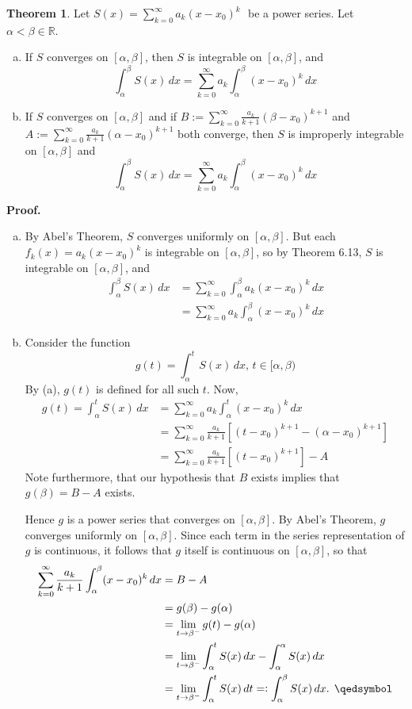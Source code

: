 \documentclass[11pt]{article}
\theoremstyle{definition}
\newtheorem{thm}{Theorem}[section]
\newcommand{\mbR}{\ensuremath{\mathbb{R}}}
\newcommand{\powerseries}{\ensuremath{S(x) = \sum_{k=0}^\infty a_k (x - x_0)^k \text{ }}}
\begin{document}
\begin{thm}
Let \powerseries be a power series. Let $\alpha < \beta \in \mbR$.
\begin{enumerate}[(a)] \vspace{-0.2cm}
\item If $S$ converges on $[\alpha, \beta]$, then $S$ is integrable on $[\alpha, \beta]$, and
$$\int_\alpha^\beta S(x)\,dx = \sum_{k=0}^\infty a_k \int_\alpha^\beta (x - x_0)^k \,dx$$
\item If $S$ converges on $[\alpha, \beta]$ and if $B := \sum_{k=0}^\infty \frac{a_k}{k+1} (\beta - x_0)^{k+1}$ and $A := \sum_{k=0}^\infty \frac{a_k}{k+1} (\alpha - x_0)^{k+1}$ both converge, then $S$ is improperly integrable on $[\alpha, \beta]$ and
$$\int_\alpha^\beta S(x)\,dx = \sum_{k=0}^\infty a_k \int_\alpha^\beta (x - x_0)^k \,dx$$
\end{enumerate}
\end{thm}
\textbf{Proof.}
\begin{enumerate}[(a)] \vspace{-0.2cm}
\item By Abel's Theorem, $S$ converges uniformly on $[\alpha, \beta]$. But each $f_k(x) = a_k (x - x_0)^k$ is integrable on $[\alpha, \beta]$, so by Theorem 6.13, $S$ is integrable on $[\alpha, \beta]$, and
\begin{align*}
\int_\alpha^\beta S(x)\,dx & = \sum_{k=0}^\infty \int_\alpha^\beta a_k(x - x_0)^k\,dx \\
& = \sum_{k=0}^\infty a_k \int_\alpha^\beta (x - x_0)^k\,dx
\end{align*}
\item Consider the function
$$g(t) = \int_\alpha^t S(x)\,dx, \, t \in [\alpha, \beta)$$
By (a), $g(t)$ is defined for all such $t$. Now,
\begin{align*}
g(t) = \int_\alpha^t S(x)\,dx & = \sum_{k=0}^\infty a_k \int_\alpha^t (x - x_0)^k \,dx \\
& = \sum_{k=0}^\infty \frac{a_k}{k+1} \left[(t - x_0)^{k+1} - (\alpha - x_0)^{k+1}\right] \\
& = \sum_{k=0}^\infty \frac{a_k}{k+1} \left[(t - x_0)^{k+1}\right] - A
\end{align*}
Note furthermore, that our hypothesis that $B$ exists implies that $g(\beta) = B - A$ exists.

Hence $g$ is a power series that converges on $[\alpha, \beta]$. By Abel's Theorem, $g$ converges uniformly on $[\alpha, \beta]$. Since each term in the series representation of $g$ is continuous, it follows that $g$ itself is continuous on $[\alpha, \beta]$, so that
\begin{align*}
\sum_{k=0}^\infty \frac{a_k}{k+1} \int_\alpha^\beta (x - x_0)^k\,dx 
& = B - A \\
& = g(\beta) - g(\alpha) \\
& = \lim_{t\to\beta^-} g(t) - g(\alpha) \\
& = \lim_{t\to\beta^-} \int_\alpha^t S(x)\,dx - \int_\alpha^\alpha S(x)\,dx \\
& = \lim_{t\to\beta^-} \int_\alpha^t S(x)\,dt =: \int_\alpha^\beta S(x)\,dx \text{. } \qedsymbol
\end{align*}
\end{enumerate}
\end{document}
